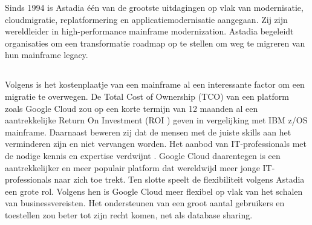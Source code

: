 Sinds 1994 is Astadia één van de grootste uitdagingen op vlak van modernisatie, cloudmigratie, replatformering en applicatiemodernisatie aangegaan. Zij zijn wereldleider in high-performance mainframe modernization. Astadia begeleidt organisaties om een transformatie roadmap op te stellen om weg te migreren van hun mainframe legacy. 

\subsection{}
\label{sec:Waarom zouden we onze mainframe legacy en databases migreren naar Google Cloud?}

Volgens \textcite{Astadia2021} is het kostenplaatje van een mainframe al een interessante factor om een migratie te overwegen. De Total Cost of Ownership (TCO) van een platform zoals Google Cloud zou op een korte termijn van 12 maanden al een aantrekkelijke Return On Investment (ROI ) geven in vergelijking met IBM z/OS mainframe. Daarnaast beweren zij dat de mensen met de juiste skills aan het verminderen zijn en niet vervangen worden. Het aanbod van IT-professionals met de nodige kennis en expertise verdwijnt \autocite{Astadia2021}. Google Cloud daarentegen is een aantrekkelijker en meer populair platform dat wereldwijd meer jonge IT-professionals naar zich toe trekt. Ten slotte speelt de flexibiliteit volgens Astadia een grote rol. Volgens hen is Google Cloud meer flexibel op vlak van het schalen van businessvereisten. Het ondersteunen van een groot aantal gebruikers en toestellen zou beter tot zijn recht komen, net als database sharing. 

